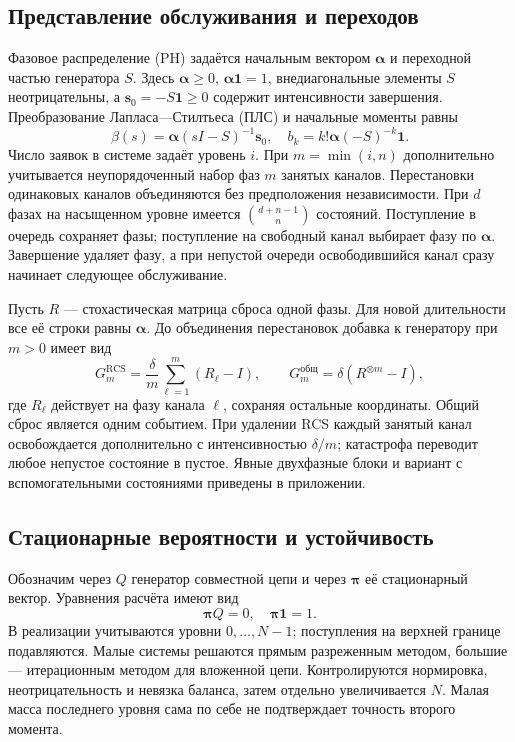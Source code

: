 \subsection{Представление обслуживания и переходов}
Фазовое распределение (PH) задаётся начальным вектором \(\boldsymbol\alpha\) и переходной частью генератора \(S\). Здесь \(\boldsymbol\alpha\ge0\), \(\boldsymbol\alpha\mathbf1=1\), внедиагональные элементы \(S\) неотрицательны, а \(\boldsymbol s_0=-S\mathbf1\ge0\) содержит интенсивности завершения. Преобразование Лапласа—Стилтьеса (ПЛС) и начальные моменты равны
\[
\beta(s)=\boldsymbol\alpha(sI-S)^{-1}\boldsymbol s_0,\quad
b_k=k!\boldsymbol\alpha(-S)^{-k}\mathbf1.
\]
Число заявок в системе задаёт уровень \(i\). При \(m=\min(i,n)\) дополнительно учитывается неупорядоченный набор фаз \(m\) занятых каналов. Перестановки одинаковых каналов объединяются без предположения независимости. При \(d\) фазах на насыщенном уровне имеется \(\binom{d+n-1}{n}\) состояний. Поступление в очередь сохраняет фазы; поступление на свободный канал выбирает фазу по \(\boldsymbol\alpha\). Завершение удаляет фазу, а при непустой очереди освободившийся канал сразу начинает следующее обслуживание.

Пусть \(R\) --- стохастическая матрица сброса одной фазы. Для новой длительности все её строки равны \(\boldsymbol\alpha\). До объединения перестановок добавка к генератору при \(m>0\) имеет вид
\[
G_m^{\mathrm{RCS}}=\frac{\delta}{m}\sum_{\ell=1}^{m}(R_\ell-I),\qquad
G_m^{\text{общ}}=\delta(R^{\otimes m}-I),
\]
где \(R_\ell\) действует на фазу канала \(\ell\), сохраняя остальные координаты. Общий сброс является одним событием. При удалении RCS каждый занятый канал освобождается дополнительно с интенсивностью \(\delta/m\); катастрофа переводит любое непустое состояние в пустое. Явные двухфазные блоки и вариант с вспомогательными состояниями приведены в приложении.

\subsection{Стационарные вероятности и устойчивость}
Обозначим через \(Q\) генератор совместной цепи и через \(\boldsymbol\pi\) её стационарный вектор. Уравнения расчёта имеют вид
\[
\boldsymbol\pi Q=0,\quad \boldsymbol\pi\mathbf1=1.
\]
В реализации учитываются уровни \(0,\ldots,N-1\); поступления на верхней границе подавляются. Малые системы решаются прямым разреженным методом, большие --- итерационным методом для вложенной цепи. Контролируются нормировка, неотрицательность и невязка баланса, затем отдельно увеличивается \(N\). Малая масса последнего уровня сама по себе не подтверждает точность второго момента.

